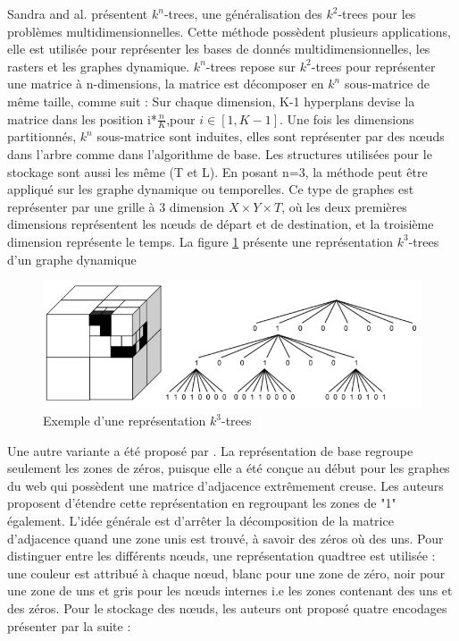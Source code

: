  Sandra and al. \citep{de2013compact} présentent $k^n$-trees, une généralisation des $k^2$-trees pour les problèmes multidimensionnelles. Cette méthode possèdent plusieurs applications, elle est utilisée pour représenter les bases de donnés multidimensionnelles, les rasters et les graphes dynamique. $k^n$-trees repose sur $k^2$-trees pour représenter une matrice à n-dimensions, la matrice est décomposer en $k^n$ sous-matrice de même taille, comme suit : Sur chaque dimension, K-1 hyperplans devise la matrice dans les position i*$\frac{n}{K}$,pour $i \in [1, K-1]$. Une fois les dimensions partitionnés, $k^n$ sous-matrice sont induites, elles sont représenter par des nœuds dans l'arbre comme dans l'algorithme de base. Les structures utilisées pour le stockage sont aussi les même (T et L).
En posant n=3, la méthode peut être appliqué sur les graphe dynamique ou temporelles. Ce type de graphes est représenter par une grille à 3 dimension $X \times Y \times T$, où les deux premières dimensions représentent les nœuds de départ et de destination, et la troisième dimension représente le temps. 
La figure \ref{kn-trees} présente une représentation $k^3$-trees d'un graphe dynamique \citep{de2014new}

\begin{figure}[H]
\begin{center}
\includegraphics[height=100 pt, width=380 pt]{./ressources/image/kn-trees.png} 
\end{center}
\caption{Exemple d'une représentation $k^3$-trees}
\label{kn-trees}
\end{figure}



Une autre variante a été proposé par \citep{de2014new}. La représentation de base regroupe seulement les zones de zéros, puisque elle a été conçue au début pour les graphes du web qui possèdent une matrice d'adjacence extrêmement creuse. Les auteurs proposent d'étendre cette représentation en regroupant les zones de "1" également. L'idée générale est d'arrêter la décomposition de la matrice d'adjacence quand une zone unis est trouvé, à savoir des zéros où des uns. Pour distinguer entre les différents nœuds, une représentation quadtree est utilisée \citep{de1997computational}: une couleur est attribué à chaque nœud, blanc pour une zone de zéro, noir pour une zone de uns et gris pour les nœuds internes i.e les zones contenant des uns et des zéros. Pour le stockage des nœuds, les auteurs ont proposé quatre encodages présenter par la suite : \\

